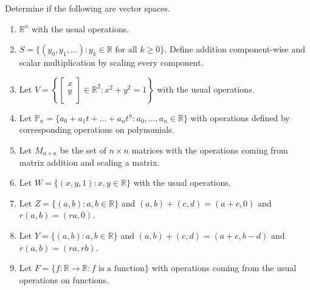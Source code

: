 \documentclass[12pt,letterpaper]{article}
\begin{document}
\begin{enumerate}

\Problem Determine if the following are vector spaces.

\begin{enumerate}
\item $\mathbb{R}^n$ with the usual operations.

\vfill
\item $S=\{(y_0, y_1, \dots ): y_k \in \mathbb{R} \text{ for  all } k \geq 0\}$. Define addition component-wise and scalar multiplication by scaling every component.

\vfill

\newpage

\item Let $V= \left\{ \begin{bmatrix} x\\ y\\ \end{bmatrix} \in \mathbb{R}^2 : x^2+y^2 =1 \right \}$ with the usual operations.

\vfill
\item Let $\mathbb{P}_n =\{ a_0+a_1 t +\dots + a_n t^n : a_0, \dots, a_n \in \mathbb{R} \}$ with operations defined by corresponding operations on polynomials.

\vfill
\item Let $M_{n\times n}$ be the set of $n\times n$ matrices with the operations coming from matrix addition and scaling a matrix.

\vfill

\item Let $W=\{(x,y,1): x,y\in \mathbb{R} \}$ with the usual operations.

\vfill

\item Let $Z=\{(a,b) : a,b \in \mathbb{R} \}$ and $(a,b)+(c,d)=(a+c,0)$ and $r(a,b)=(ra,0)$.

\vfill

\item Let $Y=\{(a,b) : a,b \in \mathbb{R} \}$ and $(a,b)+(c,d)=(a+c,b-d)$ and $r(a,b)=(ra,rb)$.

\vfill

\item Let $F=\{ f: \mathbb{R} \to \mathbb{R} : f \text{ is a function} \}$ with operations coming from the usual operations on functions.

\vfill
\newpage

\end{enumerate}


\end{enumerate}
\end{document}
